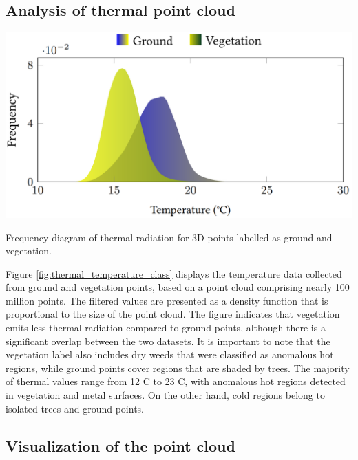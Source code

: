 \subsection{Analysis of thermal point cloud}

\begin{marginfigure}[1cm]
	\centering
	\includegraphics{figs/thermal_projection/temperature_class.png}
	\caption{Frequency diagram of thermal radiation for 3D points labelled as ground and vegetation.}
	\label{fig:thermal_temperature_class}
\end{marginfigure}
Figure \ref{fig:thermal_temperature_class} displays the temperature data collected from ground and vegetation points, based on a point cloud comprising nearly 100 million points. The filtered values are presented as a density function that is proportional to the size of the point cloud. The figure indicates that vegetation emits less thermal radiation compared to ground points, although there is a significant overlap between the two datasets. It is important to note that the vegetation label also includes dry weeds that were classified as anomalous hot regions, while ground points cover regions that are shaded by trees. The majority of thermal values range from 12 \textdegree C to 23 \textdegree C, with anomalous hot regions detected in vegetation and metal surfaces. On the other hand, cold regions belong to isolated trees and ground points.

\subsection{Visualization of the point cloud}

